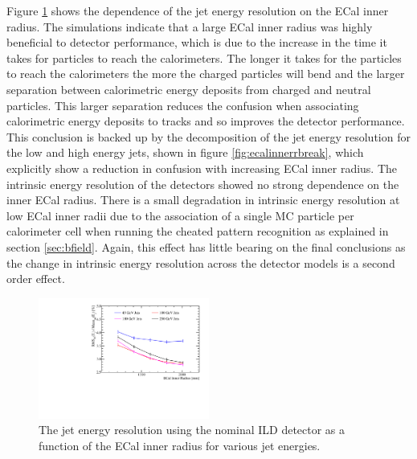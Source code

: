 Figure \ref{fig:ecalinnerr} shows the dependence of the jet energy resolution on the ECal inner radius.  The simulations indicate that a large ECal inner radius was highly beneficial to detector performance, which is due to the increase in the time it takes for particles to reach the calorimeters.  The longer it takes for the particles to reach the calorimeters the more the charged particles will bend and the larger separation between calorimetric energy deposits from charged and neutral particles.  This larger separation reduces the confusion when associating calorimetric energy deposits to tracks and so improves the detector performance.  This conclusion is backed up by the decomposition of the jet energy resolution for the low and high energy jets, shown in figure \ref{fig:ecalinnerrbreak}, which explicitly show a reduction in confusion with increasing ECal inner radius.  The intrinsic energy resolution of the detectors showed no strong dependence on the inner ECal radius.  There is a small degradation in intrinsic energy resolution at low ECal inner radii due to the association of a single MC particle per calorimeter cell when running the cheated pattern recognition as explained in section \ref{sec:bfield}.  Again, this effect has little bearing on the final conclusions as the change in intrinsic energy resolution across the detector models is a second order effect.  

\begin{figure}[h!]
\includegraphics[width=0.5\textwidth]{OptimisationStudies/Plots/JetEnergyResolutions/JER_vs_ECalInnerRadius.pdf}
\caption[The jet energy resolution using the nominal ILD detector as a function of the ECal inner radius for various jet energies.]{The jet energy resolution using the nominal ILD detector as a function of the ECal inner radius for various jet energies.}
\label{fig:ecalinnerr}
\end{figure}

